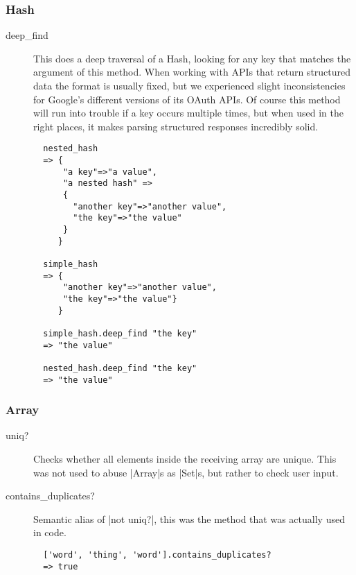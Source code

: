 \subsubsection{Hash}

\begin{description}

\item[deep\_find] This does a deep traversal of a Hash, looking for any key that matches the argument of this method. When working with APIs that return structured data the format is usually fixed, but we experienced slight inconsistencies for Google's different versions of its OAuth APIs. Of course this method will run into trouble if a key occurs multiple times, but when used in the right places, it makes parsing structured responses incredibly solid.
\\
\begin{lstlisting}
  nested_hash
  => {
      "a key"=>"a value",
      "a nested hash" =>
      {
        "another key"=>"another value",
        "the key"=>"the value"
      }
     }

  simple_hash
  => {
      "another key"=>"another value",
      "the key"=>"the value"}
     }

  simple_hash.deep_find "the key"
  => "the value"

  nested_hash.deep_find "the key"
  => "the value"
\end{lstlisting}

\end{description}

\subsubsection{Array}

\begin{description}

\item[uniq?] Checks whether all elements inside the receiving array are unique. This was not used to abuse |Array|s as |Set|s, but rather to check user input.

\item[contains\_duplicates?] Semantic alias of |not uniq?|, this was the method that was actually used in code.
\\
\begin{lstlisting}
  ['word', 'thing', 'word'].contains_duplicates?
  => true
\end{lstlisting}

\end{description}

